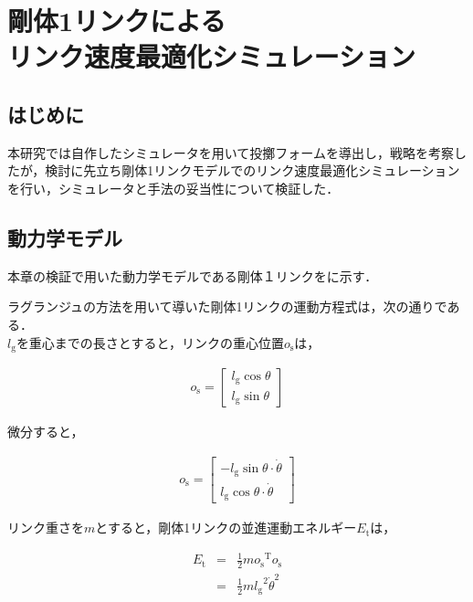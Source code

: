 \chapter[剛体1リンクによるリンク速度最適化シミュレーション]{剛体1リンクによる\\リンク速度最適化シミュレーション}

\section{はじめに}
本研究では自作したシミュレータを用いて投擲フォームを導出し，戦略を考察したが，検討に先立ち剛体1リンクモデルでのリンク速度最適化シミュレーションを行い，シミュレータと手法の妥当性について検証した．
\section{動力学モデル}
本章の検証で用いた動力学モデルである剛体１リンクをに示す．\\


ラグランジュの方法\cite{lagrange}を用いて導いた剛体1リンクの運動方程式は，次の通りである．\\
$l_{\mathrm{g}}$を重心までの長さとすると，リンクの重心位置$o_{\mathrm{s}}$は，

\begin{eqnarray}
  o_{\mathrm{s}} = 
              \begin{bmatrix}
              l_{\mathrm{g}}\cos\theta\\
              l_{\mathrm{g}}\sin\theta
              \end{bmatrix}
\end{eqnarray}

微分すると，

\begin{eqnarray}
  o_{\mathrm{\dot{s}}} = 
              \begin{bmatrix}
              -l_{\mathrm{g}}\sin\theta \cdot \dot{\theta}\\
              l_{\mathrm{g}}\cos\theta \cdot \dot{\theta}
              \end{bmatrix}
\end{eqnarray}

リンク重さを$m$とすると，剛体1リンクの並進運動エネルギー$E_{\mathrm{t}}$は，

\begin{eqnarray}
  E_{\mathrm{t}} 
  &=&\frac{1}{2}mo_{\mathrm{\dot{s}}}{}^\mathrm{T}\!o_{\mathrm{\dot{s}}} \nonumber \\
  &=&\frac{1}{2}m{l_{\mathrm{g}}}^2{\dot{\theta}}^2
\end{eqnarray}

